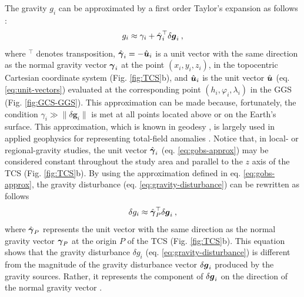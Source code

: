 \documentclass[extra]{gji}
\begin{document}
The gravity $g_{i}$ can be approximated by a first order Taylor's 
expansion as follows \citep{sanso_sideris2013}:
\begin{equation}
g_{i} \approx \gamma_{i} + 
\hat{\mitbf{\gamma}}_{i}^{\top} \delta \mitbf{g}_{i} \: ,
\label{eq:gobs-approx}
\end{equation}
where $^{\top}$ denotes transposition,
$\hat{\mitbf{\gamma}}_{i} = -\hat{\mitbf{u}}_{i}$ is a unit 
vector with the same direction as the normal gravity vector 
$\mitbf{\gamma}_{i}$ at the point $(x_{i}, y_{i}, z_{i})$, in the
topocentric Cartesian coordinate system (Fig. \ref{fig:TCS}b), and
$\hat{\mitbf{u}}_{i}$ is the unit vector $\hat{\mitbf{u}}$ 
(eq. \ref{eq:unit-vectors}) evaluated at the corresponding 
point $(h_{i}, \varphi_{i}, \lambda_{i})$ in the 
GGS (Fig. \ref{fig:GCS-GGS}).
This approximation can be made because, fortunately, 
the condition $\gamma_{i} \gg \| \delta \mathbf{g}_{i} \|$ 
is met at all points located above or on the Earth's surface.
This approximation, which is known in geodesy \citep[e.g.,][]{sanso_sideris2013},
is largely used in applied geophysics for representing
total-field anomalies \citep[e.g.,][]{blakely1996}.
Notice that, in local- or regional-gravity studies, the unit
vector $\hat{\mitbf{\gamma}}_{i}$ (eq. \ref{eq:gobs-approx}) 
may be considered constant throughout the study area and 
parallel to the $z$ axis of the TCS (Fig. \ref{fig:TCS}b).
By using the approximation defined in eq. 
\ref{eq:gobs-approx}, the gravity disturbance 
(eq. \ref{eq:gravity-disturbance}) can be rewritten as 
follows 
\begin{equation}
\delta g_{i} \approx \hat{\mitbf{\gamma}}_{P}^{\top} \delta \mitbf{g}_{i} \: ,
\label{eq:gravity-disturbance-approx-TCS}
\end{equation}
where $\hat{\mitbf{\gamma}}_{P}$ represents the unit vector with
the same direction as the normal gravity vector $\mitbf{\gamma}_{P}$
at the origin $P$ of the TCS (Fig. \ref{fig:TCS}b).
This equation shows that the gravity disturbance $\delta g_{i}$ (eq. \ref{eq:gravity-disturbance}) is different from the magnitude
of the gravity disturbance vector $\delta \mitbf{g}_{i}$
produced by the gravity sources. Rather, it represents the 
component of $\delta \mitbf{g}_{i}$ on the direction of the normal
gravity vector \citep{hofmann-wellenhof-moritz2005, sanso_sideris2013}. 
\end{document}
